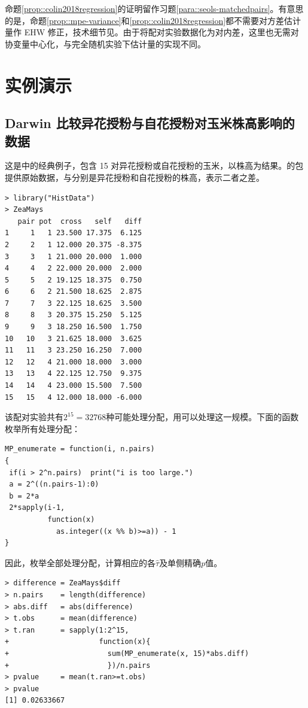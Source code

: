命题\ref{prop::colin2018regression}的证明留作习题\ref{para::seols-matchedpairs}。有意思的是，命题\ref{prop::mpe-variance}和\ref{prop::colin2018regression}都不需要对方差估计量作 EHW 修正，技术细节见\citet{fogarty2018regression}。由于将配对实验数据化为对内差，这里也无需对协变量中心化，与完全随机实验下\citet{lin2013}估计量的实现不同。

 


\section{实例演示}

\subsection{Darwin 比较异花授粉与自花授粉对玉米株高影响的数据}
\label{sec::frt-darwin-mpe}

这是\citet{Fisher:1935}中的经典例子，包含 15 对异花授粉或自花授粉的玉米，以株高为结果。的包提供原始数据，与分别是异花授粉和自花授粉的株高，表示二者之差。 

\begin{lstlisting}
> library("HistData")
> ZeaMays
   pair pot  cross   self   diff
1     1   1 23.500 17.375  6.125
2     2   1 12.000 20.375 -8.375
3     3   1 21.000 20.000  1.000
4     4   2 22.000 20.000  2.000
5     5   2 19.125 18.375  0.750
6     6   2 21.500 18.625  2.875
7     7   3 22.125 18.625  3.500
8     8   3 20.375 15.250  5.125
9     9   3 18.250 16.500  1.750
10   10   3 21.625 18.000  3.625
11   11   3 23.250 16.250  7.000
12   12   4 21.000 18.000  3.000
13   13   4 22.125 12.750  9.375
14   14   4 23.000 15.500  7.500
15   15   4 12.000 18.000 -6.000
\end{lstlisting}
 


该配对实验共有$2^{15} = 32768$种可能处理分配，用可以处理这一规模。下面的函数枚举所有处理分配：

\begin{lstlisting}
MP_enumerate = function(i, n.pairs) 
{
 if(i > 2^n.pairs)  print("i is too large.")
 a = 2^((n.pairs-1):0)
 b = 2*a
 2*sapply(i-1, 
          function(x) 
            as.integer((x %% b)>=a)) - 1
}
\end{lstlisting}



因此，枚举全部处理分配，计算相应的各$\hat{\tau}$及单侧精确$p$值。 

\begin{lstlisting}
> difference = ZeaMays$diff 
> n.pairs    = length(difference)
> abs.diff   = abs(difference)
> t.obs      = mean(difference)
> t.ran      = sapply(1:2^15, 
+                     function(x){ 
+                       sum(MP_enumerate(x, 15)*abs.diff) 
+                       })/n.pairs
> pvalue     = mean(t.ran>=t.obs)
> pvalue
[1] 0.02633667
\end{lstlisting}


